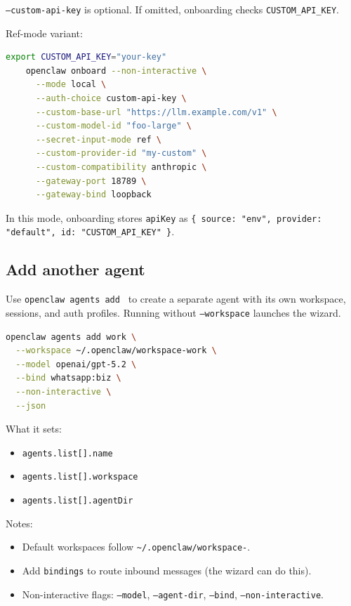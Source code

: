 \texttt{--custom-api-key} is optional. If omitted, onboarding checks \texttt{CUSTOM\_API\_KEY}.

Ref-mode variant:

\begin{lstlisting}[language=bash]
    export CUSTOM_API_KEY="your-key"
    openclaw onboard --non-interactive \
      --mode local \
      --auth-choice custom-api-key \
      --custom-base-url "https://llm.example.com/v1" \
      --custom-model-id "foo-large" \
      --secret-input-mode ref \
      --custom-provider-id "my-custom" \
      --custom-compatibility anthropic \
      --gateway-port 18789 \
      --gateway-bind loopback
\end{lstlisting}


In this mode, onboarding stores \texttt{apiKey} as \texttt{\{ source: "env", provider: "default", id: "CUSTOM\_API\_KEY" \}}.


\subsection{Add another agent}


Use \texttt{openclaw agents add } to create a separate agent with its own workspace,
sessions, and auth profiles. Running without \texttt{--workspace} launches the wizard.

\begin{lstlisting}[language=bash]
openclaw agents add work \
  --workspace ~/.openclaw/workspace-work \
  --model openai/gpt-5.2 \
  --bind whatsapp:biz \
  --non-interactive \
  --json
\end{lstlisting}


What it sets:

\begin{itemize}
  \item \texttt{agents.list[].name}
  \item \texttt{agents.list[].workspace}
  \item \texttt{agents.list[].agentDir}
\end{itemize}


Notes:

\begin{itemize}
  \item Default workspaces follow \texttt{\textasciitilde{}/.openclaw/workspace-}.
  \item Add \texttt{bindings} to route inbound messages (the wizard can do this).
  \item Non-interactive flags: \texttt{--model}, \texttt{--agent-dir}, \texttt{--bind}, \texttt{--non-interactive}.
\end{itemize}


